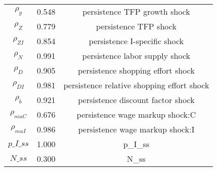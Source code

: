 \begin{center}
\begin{longtable}{ccc}
${\rho_g}$ 	 & 	 0.548 	 & 	 persistence TFP growth shock\\
${\rho_Z}$ 	 & 	 0.779 	 & 	 persistence TFP shock\\
${\rho_{ZI}}$ 	 & 	 0.854 	 & 	 persistence I-specific shock\\
${\rho_N}$ 	 & 	 0.991 	 & 	 persistence labor supply shock\\
${\rho_D}$ 	 & 	 0.905 	 & 	 persistence shopping effort shock\\
${\rho_{DI}}$ 	 & 	 0.981 	 & 	 persistence relative shopping effort shock\\
${\rho_b}$ 	 & 	 0.921 	 & 	 persistence discount factor shock\\
${\rho_{muC}}$ 	 & 	 0.676 	 & 	 persistence wage markup shock:C\\
${\rho_{muI}}$ 	 & 	 0.986 	 & 	 persistence wage markup shock:I\\
$p\_I\_ss$ 	 & 	 1.000 	 & 	 p\_I\_ss\\
$N\_ss$ 	 & 	 0.300 	 & 	 N\_ss\\
\bottomrule%
\end{longtable}
\end{center}
